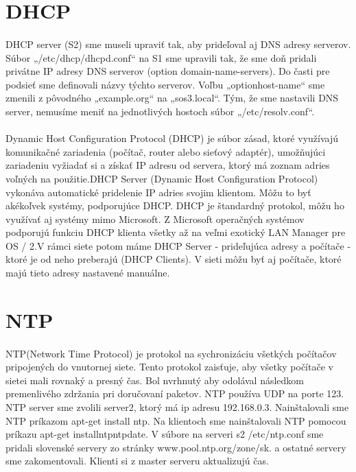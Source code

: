 \section{DHCP}
\paragraph{}
DHCP server (S2) sme museli upraviť tak, aby prideľoval aj DNS adresy serverov. Súbor „/etc/dhcp/dhcpd.conf“ na S1 sme upravili tak, že sme doň pridali privátne IP adresy DNS serverov (option domain-name-servers). Do časti pre podsieť sme definovali názvy týchto serverov. Voľbu „optionhost-name“ sme zmenili z pôvodného „example.org“ na „sos3.local“. Tým, že sme nastavili DNS server, nemusíme meniť na jednotlivých hostoch súbor „/etc/resolv.conf“.
\paragraph{}
Dynamic Host Configuration Protocol (DHCP) je súbor zásad, ktoré využívajú komunikačné zariadenia (počítač, router alebo sieťový adaptér), umožňujúci zariadeniu vyžiadať si a získať IP adresu od servera, ktorý má zoznam adries voľných na použitie.DHCP Server (Dynamic Host Configuration Protocol) vykonáva automatické pridelenie IP adries svojim klientom. Môžu to byť akékoľvek systémy, podporujúce DHCP. DHCP je štandardný protokol, môžu ho využívať aj systémy mimo Microsoft. Z Microsoft operačných systémov podporujú funkciu DHCP klienta všetky až na veľmi exotický LAN Manager pre OS / 2.V rámci siete potom máme DHCP Server - prideľujúca adresy a počítače - ktoré je od neho preberajú (DHCP Clients). V sieti môžu byť aj počítače, ktoré majú tieto adresy nastavené manuálne.

\section{NTP}
\paragraph{}
NTP(Network Time Protocol) je protokol na sychronizáciu všetkých počítačov pripojených do vnutornej siete. Tento protokol zaisťuje, aby všetky počítače v sietei mali rovnaký a presný čas. Bol nvrhnutý aby odolával následkom premenlivého zdržania pri doručovaní paketov. NTP používa UDP na porte 123. NTP server sme zvolili server2, ktorý má ip adresu 192.168.0.3. Nainštalovali sme NTP príkazom apt-get install ntp. Na klientoch sme nainštalovali NTP pomocou príkazu apt-get installntpntpdate. V súbore na serveri s2 /etc/ntp.conf sme pridali slovenské servery zo stránky www.pool.ntp.org/zone/sk. a ostatné servery sme zakomentovali. Klienti si z master serveru aktualizujú čas.

